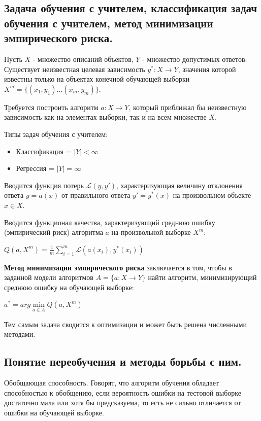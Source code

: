 \documentclass{article}
\begin{document}
\subsection{Задача обучения с учителем, классификация задач обучения с учителем, метод
минимизации эмпирического риска.}
\label{sec:supervised_learning}

Пусть $X$ - множество описаний объектов, $Y$ - множество допустимых ответов.
Существует неизвестная целевая зависимость $y^*: X \to Y$, значения которой
известны только на объектах конечной обучающей выборки $X^m = \{(x_1, y_1)\dots (x_m, y_m)\}$.

Требуется построить алгоритм $a: X \to Y$, который приближал бы неизвестную
зависимость как на элементах выборки, так и на всем множестве $X$.

Типы задач обучения с учителем:
\begin{itemize}
    \item Классификация = $|Y| < \infty$
    \item Регрессия = $|Y| = \infty$
\end{itemize}

Вводится функция потерь $\mathcal{L}(y, y')$, характеризующая величину
отклонения ответа $y = a(x)$ от правильного ответа $y' = y^*(x)$ на
произвольном объекте $x \in X$.

Вводится функционал качества, характеризующий среднюю ошибку
(эмпирический риск) алгоритма $a$ на произвольной выборке $X^m$:

$Q(a, X^m) = \frac{1}{m}\sum\limits_{i=1}^m \mathcal{L}(a(x_i), y^*(x_i))$

\textbf{Метод минимизации эмпирического риска} заключается в том, чтобы
в заданной модели алгоритмов $A = \{a: X \to Y\}$ найти алгоритм, минимизирующий
среднюю ошибку на обучающей выборке:

$a^* = arg \min\limits_{a \in A} Q(a, X^m)$

Тем самым задача сводится к оптимизации и может быть решена численными методами.


\subsection{Понятие переобучения и методы борьбы с ним.}

Обобщающая способность. Говорят, что алгоритм обучения обладает способностью
к обобщению, если вероятность ошибки на тестовой выборке достаточно
мала или хотя бы предсказуема, то есть не сильно отличается от ошибки
на обучающей выборке.
\end{document}

